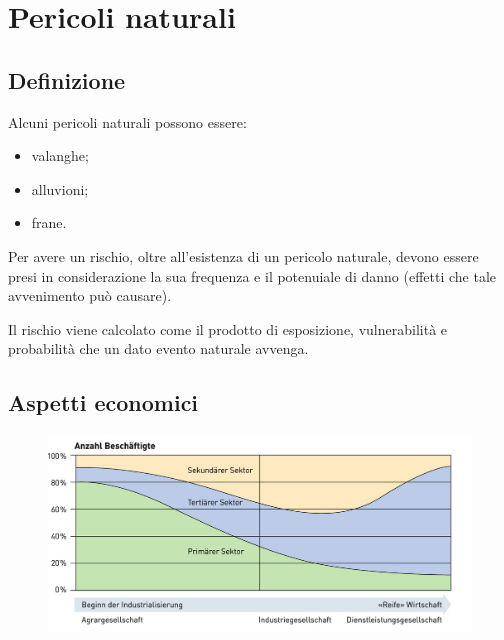 \documentclass[a4paper]{article}
\begin{document}
\section{Pericoli naturali}

\subsection{Definizione}


Alcuni pericoli naturali possono essere:
\begin{itemize}
    \item valanghe;
    \item alluvioni;
    \item frane.
\end{itemize}

Per avere un rischio, oltre all'esistenza di un pericolo naturale, devono essere presi
in considerazione la sua frequenza e il potenuiale di danno (effetti che tale
avvenimento può causare).

Il rischio viene calcolato come il prodotto di
esposizione, vulnerabilità e probabilità che un dato evento naturale avvenga.

\subsection{Aspetti economici}


\begin{center}
\begin{figure}[th]
    \centering
    \includegraphics[width=\textwidth]{./fourastie.png}
\end{figure}
\end{center}
\end{document}
